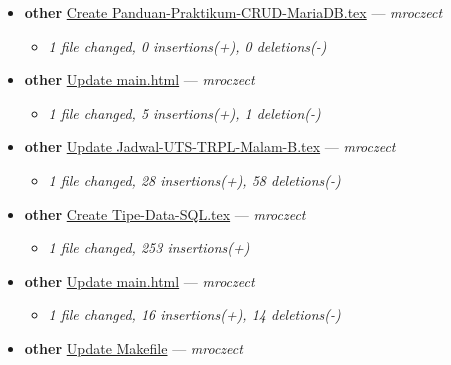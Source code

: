 \begin{itemize}[leftmargin=1.5em]
\begin{itemize}[leftmargin=1.5em]
  \end{itemize}
  \item \textbf{other} \href{https://github.com/mroczect/mroczect.github.io/commit/44f4958f2395a50c0083d91af0376ab56181574a}{Create Panduan-Praktikum-CRUD-MariaDB.tex} --- \textit{mroczect}
  \begin{itemize}[leftmargin=1.5em]
    \item \small\textit{1 file changed, 0 insertions(+), 0 deletions(-)}
  \end{itemize}
  \item \textbf{other} \href{https://github.com/mroczect/mroczect.github.io/commit/249bd7eab0f54bdb704b386ea9f004b365755514}{Update main.html} --- \textit{mroczect}
  \begin{itemize}[leftmargin=1.5em]
    \item \small\textit{1 file changed, 5 insertions(+), 1 deletion(-)}
  \end{itemize}
  \item \textbf{other} \href{https://github.com/mroczect/mroczect.github.io/commit/b3809b5dac84bb5469c45ba3b438be0ef2bc5fce}{Update Jadwal-UTS-TRPL-Malam-B.tex} --- \textit{mroczect}
  \begin{itemize}[leftmargin=1.5em]
    \item \small\textit{1 file changed, 28 insertions(+), 58 deletions(-)}
  \end{itemize}
  \item \textbf{other} \href{https://github.com/mroczect/mroczect.github.io/commit/dcdddffdc86ed0f4ba618506b057717048690b85}{Create Tipe-Data-SQL.tex} --- \textit{mroczect}
  \begin{itemize}[leftmargin=1.5em]
    \item \small\textit{1 file changed, 253 insertions(+)}
  \end{itemize}
  \item \textbf{other} \href{https://github.com/mroczect/mroczect.github.io/commit/07e2924f5f000e94315f108004701f1a4418ec8e}{Update main.html} --- \textit{mroczect}
  \begin{itemize}[leftmargin=1.5em]
    \item \small\textit{1 file changed, 16 insertions(+), 14 deletions(-)}
  \end{itemize}
  \item \textbf{other} \href{https://github.com/mroczect/mroczect.github.io/commit/569ffb04847d061fd9bd95e65f1b30fc67802da8}{Update Makefile} --- \textit{mroczect}
  \begin{itemize}[leftmargin=1.5em]

\end{itemize}
\end{itemize}
